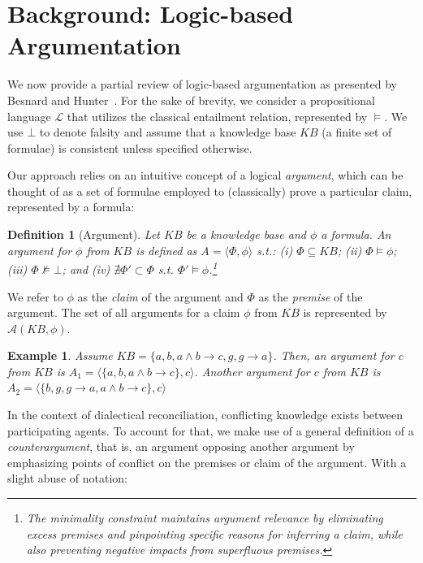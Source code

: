 \documentclass{ecai}
\newtheorem{definition}{{\bf Definition}}
\newtheorem{example}{\bf Example}
\begin{document}
\section{Background: Logic-based Argumentation}
\label{sec:background}




We now provide a partial review of logic-based argumentation as presented by Besnard and Hunter~\cite{besnard2001logic}. For the sake of brevity, we consider a propositional language $\mathcal{L}$ that utilizes the classical entailment relation, represented by $\models$. We use $\bot$ to denote falsity and assume that a knowledge base $KB$ (a finite set of formulae) is consistent unless specified otherwise.

Our approach relies on an intuitive concept of a logical \emph{argument}, which can be thought of as a set of formulae employed to (classically) prove a particular claim, represented by a formula:

\begin{definition}[Argument]
    Let $KB$ be a knowledge base and $\phi$ a formula. An \emph{argument} for $\phi$ from $KB$ is defined as $A = \langle \Phi, \phi \rangle$ s.t.: (i) $\Phi \subseteq KB$; (ii) $\Phi \models \phi$; (iii) $\Phi \not \models \bot$; and (iv) $\nexists \Phi' \subset \Phi$ s.t. $\Phi' \models \phi$.\footnote{The minimality constraint maintains argument relevance by eliminating excess premises and pinpointing specific reasons for inferring a claim, while also preventing negative impacts from superfluous premises.}
    \label{def:arg}
\end{definition}


\noindent We refer to $\phi$ as the \emph{claim} of the argument and $\Phi$ as the \emph{premise} of the argument. The set of all arguments for a claim $\phi$ from $KB$ is represented by $\mathcal{A}(KB, \phi)$.



\begin{example}
Assume $KB = \{a, b, a \land b \!\rightarrow\! c, g, g \!\rightarrow\! a\}$. Then, an argument for $c$ from $KB$ is $A_1 = \langle \{a, b, a \land b \!\rightarrow\! c \}, c\rangle$. Another argument for $c$ from $KB$ is $A_2 = \langle \{ b, g, g\!\rightarrow\! a , a\land b \!\rightarrow\! c \}, c\rangle$
\end{example}



In the context of dialectical reconciliation, conflicting knowledge exists between participating agents. To account for that, we make use of a general definition of a \emph{counterargument}, that is, an argument opposing another argument by emphasizing points of conflict on the premises or claim of the argument. With a slight abuse of notation:
\end{document}
